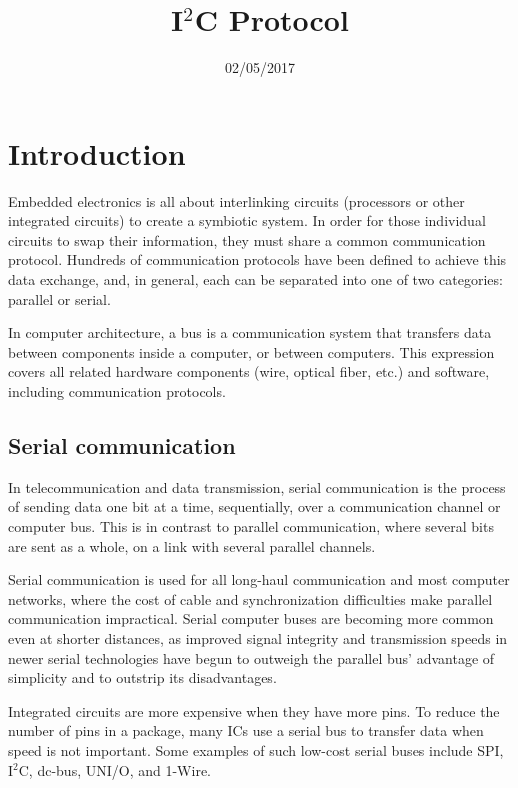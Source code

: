 \documentclass[12pt,twocolumn]{IEEEtran}
\title{I$^{2}$C Protocol}
\author{\IEEEauthorblockN{Varanasi Shashank}
\IEEEauthorblockA{- ES16BTECH11025\\}
\and
\IEEEauthorblockN{Akshita Ramya}
\IEEEauthorblockA{- ES16BTECH11012\\}
\and
\IEEEauthorblockN{Aravind Ganesh}
\IEEEauthorblockA{- EE16BTECH11026\\}
\and
\IEEEauthorblockN{Srinidhi Bachu}
\IEEEauthorblockA{- ES16BTECH11029\\} 
\and
\IEEEauthorblockN{Jeel Bhavsar}
\IEEEauthorblockA{- ES16BTECH11005} 
}
\date{02/05/2017}
\begin{document}
  \maketitle
    \section{Introduction}
    
     Embedded electronics is all about interlinking circuits (processors or other integrated circuits) to create a symbiotic system. In order for those individual circuits to swap their information, they must share a common communication protocol. Hundreds of communication protocols have been defined to achieve this data exchange, and, in general, each can be separated into one of two categories: parallel or serial.

In computer architecture, a bus is a communication system that transfers data between components inside a computer, or between computers. This expression covers all related hardware components (wire, optical fiber, etc.) and software, including communication protocols.

   \subsection {Serial communication}

In telecommunication and data transmission, serial communication is the process of sending data one bit at a time, sequentially, over a communication channel or computer bus. This is in contrast to parallel communication, where several bits are sent as a whole, on a link with several parallel channels.

Serial communication is used for all long-haul communication and most computer networks, where the cost of cable and synchronization difficulties make parallel communication impractical. Serial computer buses are becoming more common even at shorter distances, as improved signal integrity and transmission speeds in newer serial technologies have begun to outweigh the parallel bus' advantage of simplicity and to outstrip its disadvantages.

Integrated circuits are more expensive when they have more pins. To reduce the number of pins in a package, many ICs use a serial bus to transfer data when speed is not important. Some examples of such low-cost serial buses include SPI, I$^{2}$C, dc-bus, UNI/O, and 1-Wire.

  
\end{document}
